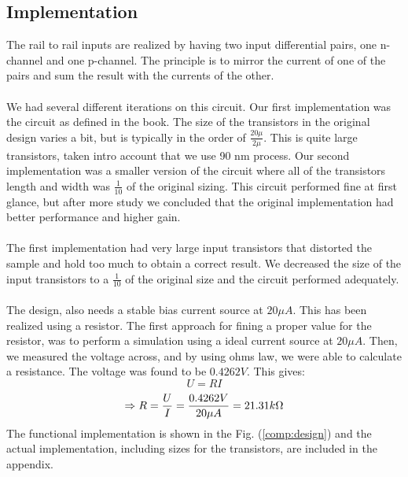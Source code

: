 \documentclass[english, 12pt, a4paper]{ifimaster}
\begin{document}
\subsection{Implementation}
The rail to rail inputs are realized by having two input differential pairs, one n-channel and one p-channel.
The principle is to mirror the current of one of the pairs and sum the result with the currents of the other.\\
\\
We had several different iterations on this circuit.
Our first implementation was the circuit as defined in the book. The size of the transistors in the original design varies a bit, but is typically in the order of 
\( \frac{20\mu}{2\mu} \). This is quite large transistors, taken intro account that we use 90 nm process. 
Our second implementation was a smaller version of the circuit where all of the transistors length and width was \( \frac{1}{10} \) of the original sizing. 
This circuit performed fine at first glance, but after more study we concluded that the original implementation had better performance and higher gain.\\ 
\\
The first implementation had very large input transistors that distorted the sample and hold too much to obtain a correct result.
We decreased the size of the input transistors to a \( \frac{1}{10} \) of the original size and the circuit performed adequately.\\
\\
The design, also needs a stable bias current source at \(20 \mu A\). This has been realized using a resistor. The first approach for fining a proper value for the resistor,
was to perform a simulation using a ideal current source at \(20 \mu A\). Then, we measured the voltage across, and by using ohms law, we were able to calculate a resistance.
The voltage was found to be \(0.4262 V\). This gives:
\begin{equation}
 U = RI
\end{equation}
\begin{equation}
 \Rightarrow R = \frac{U}{I} = \frac{0.4262 V}{20 \mu A} = 21.31 k\ohm	
\end{equation}
\newline
The functional implementation is shown in the Fig. (\ref{comp:design}) and the actual implementation, including sizes for the transistors, are included in the appendix.
\end{document}
